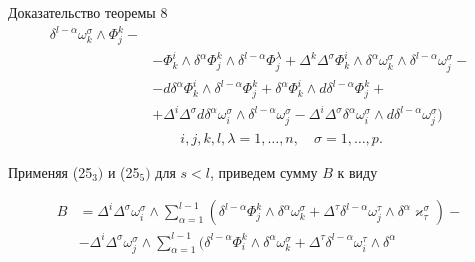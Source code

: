 \begin{pf*}{Доказательство теоремы 8}
\begin{align*}
\delta^{l-\alpha}\omega^{\sigma}_k\wedge\Phi^k_j-\\


%


&-\Phi^i_k\wedge\delta^{\alpha}\Phi^k_j\wedge


\delta^{l-\alpha}\Phi^{\lambda}_j


+\Delta^k\Delta^{\sigma}\Phi^i_k\wedge\delta^{\alpha}


\omega^{\sigma}_k\wedge\delta^{l-\alpha}\omega^{\sigma}_j-\\


%


&-d\delta^{\alpha}\Phi^i_k\wedge\delta^{l-\alpha}\Phi^k_j+


\delta^{\alpha}\Phi^i_k\wedge d\delta^{l-\alpha}\Phi^k_j+\\


%


&+\Delta^i\Delta^{\sigma}d\delta^{\alpha}\omega^{\sigma}_i


\wedge\delta^{l-\alpha}\omega^{\sigma}_j-


\Delta^i\Delta^{\sigma}\delta^{\alpha}\omega^{\sigma}_i


\wedge d\delta^{l-\alpha}\omega^{\sigma}_j)\\


%


&\qquad i,j,k,l,\lambda=1,\dotsc,n,\quad \sigma=1,\dotsc,p.


\end{align*}


Применяя (25${}_3)$ и (25${}_5)$ для $s<l$, приведем сумму $B$ к виду


\begin{align*}


B&=\Delta^i\Delta^{\sigma}\omega^{\sigma}_i\wedge


\sum_{\alpha=1}^{l-1}(\delta^{l-\alpha}\Phi^k_j\wedge\delta^{\alpha}


\omega^{\sigma}_k+


\Delta^{\tau}\delta^{l-\alpha}\omega^{\tau}_j\wedge\delta^{\alpha}


\varkappa^{\sigma}_{\tau})-\\


%


&-\Delta^i\Delta^{\sigma}\omega^{\sigma}_j\wedge\sum_{\alpha=1}^{l-1}


(\delta^{l-\alpha}\Phi^k_i\wedge\delta^{\alpha}\omega^{\sigma}_k+


\Delta^{\tau}\delta^{l-\alpha}\omega^{\tau}_i\wedge\delta^{\alpha}



\end{align*}
\end{pf*}
